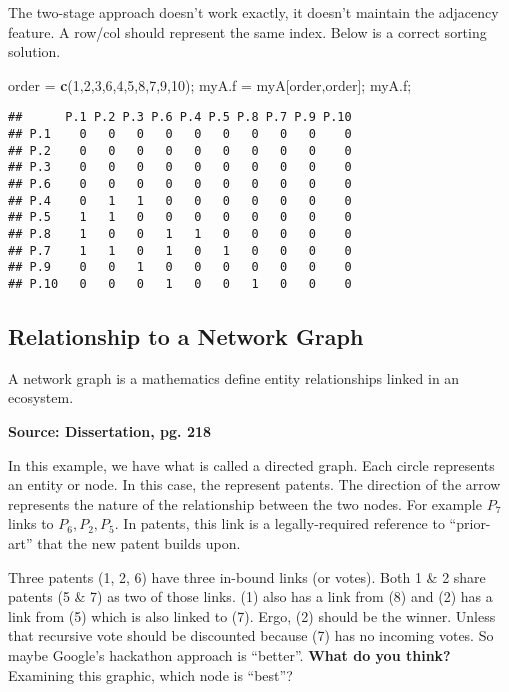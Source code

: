 \documentclass[
]{article}
\newenvironment{Shaded}{\begin{snugshade}}{\end{snugshade}}
\newcommand{\DecValTok}[1]{\textcolor[rgb]{0.00,0.00,0.81}{#1}}
\newcommand{\KeywordTok}[1]{\textcolor[rgb]{0.13,0.29,0.53}{\textbf{#1}}}
\newcommand{\NormalTok}[1]{#1}
\newcommand{\StringTok}[1]{\textcolor[rgb]{0.31,0.60,0.02}{#1}}
\begin{document}
The two-stage approach doesn't work exactly, it doesn't maintain the
adjacency feature. A row/col should represent the same index. Below is a
correct sorting solution.

\begin{Shaded}
\begin{Highlighting}[]
\NormalTok{order =}\StringTok{ }\KeywordTok{c}\NormalTok{(}\DecValTok{1}\NormalTok{,}\DecValTok{2}\NormalTok{,}\DecValTok{3}\NormalTok{,}\DecValTok{6}\NormalTok{,}\DecValTok{4}\NormalTok{,}\DecValTok{5}\NormalTok{,}\DecValTok{8}\NormalTok{,}\DecValTok{7}\NormalTok{,}\DecValTok{9}\NormalTok{,}\DecValTok{10}\NormalTok{);}
\NormalTok{myA.f =}\StringTok{ }\NormalTok{myA[order,order];}
\NormalTok{myA.f;}
\end{Highlighting}
\end{Shaded}

\begin{verbatim}
##      P.1 P.2 P.3 P.6 P.4 P.5 P.8 P.7 P.9 P.10
## P.1    0   0   0   0   0   0   0   0   0    0
## P.2    0   0   0   0   0   0   0   0   0    0
## P.3    0   0   0   0   0   0   0   0   0    0
## P.6    0   0   0   0   0   0   0   0   0    0
## P.4    0   1   1   0   0   0   0   0   0    0
## P.5    1   1   0   0   0   0   0   0   0    0
## P.8    1   0   0   1   1   0   0   0   0    0
## P.7    1   1   0   1   0   1   0   0   0    0
## P.9    0   0   1   0   0   0   0   0   0    0
## P.10   0   0   0   1   0   0   1   0   0    0
\end{verbatim}

\hypertarget{relationship-to-a-network-graph}{%
\subsection{Relationship to a Network
Graph}\label{relationship-to-a-network-graph}}

A network graph is a mathematics define entity relationships linked in
an ecosystem.

\textbf{Source: Dissertation, pg. 218}

In this example, we have what is called a directed graph. Each circle
represents an entity or node. In this case, the represent patents. The
direction of the arrow represents the nature of the relationship between
the two nodes. For example \(P_7\) links to \({P_6, P_2, P_5}\). In
patents, this link is a legally-required reference to ``prior-art'' that
the new patent builds upon.

Three patents (1, 2, 6) have three in-bound links (or votes). Both 1 \&
2 share patents (5 \& 7) as two of those links. (1) also has a link from
(8) and (2) has a link from (5) which is also linked to (7). Ergo, (2)
should be the winner. Unless that recursive vote should be discounted
because (7) has no incoming votes. So maybe Google's hackathon approach
is ``better''. \textbf{What do you think?} Examining this graphic, which
node is ``best''?
\end{document}
